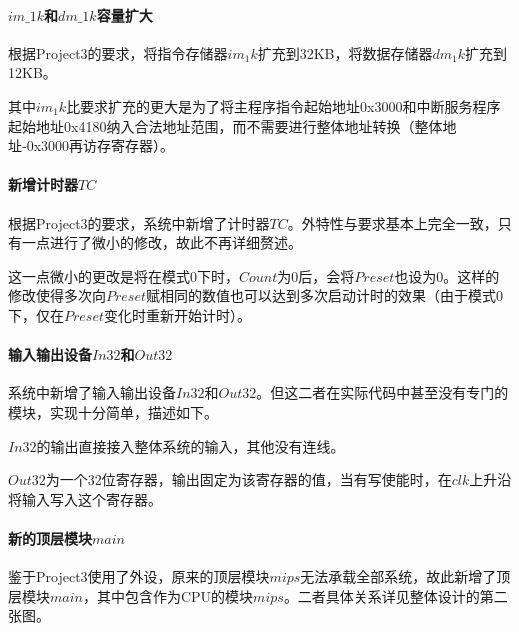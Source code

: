 \documentclass[main.tex]{subfiles}
\begin{document}
\paragraph{$im\_1k$和$dm\_1k$容量扩大}

根据Project3的要求，将指令存储器$im_1k$扩充到32KB，将数据存储器$dm_1k$扩充到12KB。

其中$im_1k$比要求扩充的更大是为了将主程序指令起始地址0x3000和中断服务程序起始地址0x4180纳入合法地址范围，而不需要进行整体地址转换（整体地址-0x3000再访存寄存器）。

\paragraph{新增计时器$TC$}

根据Project3的要求，系统中新增了计时器$TC$。外特性与要求基本上完全一致，只有一点进行了微小的修改，故此不再详细赘述。

这一点微小的更改是将在模式0下时，$Count$为0后，会将$Preset$也设为0。这样的修改使得多次向$Preset$赋相同的数值也可以达到多次启动计时的效果（由于模式0下，仅在$Preset$变化时重新开始计时）。

\paragraph{输入输出设备$In32$和$Out32$}

系统中新增了输入输出设备$In32$和$Out32$。但这二者在实际代码中甚至没有专门的模块，实现十分简单，描述如下。

$In32$的输出直接接入整体系统的输入，其他没有连线。

$Out32$为一个32位寄存器，输出固定为该寄存器的值，当有写使能时，在$clk$上升沿将输入写入这个寄存器。

\paragraph{新的顶层模块$main$}
鉴于Project3使用了外设，原来的顶层模块$mips$无法承载全部系统，故此新增了顶层模块$main$，其中包含作为CPU的模块$mips$。二者具体关系详见整体设计的第二张图。
\end{document}
